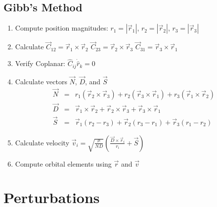 \documentclass{article}
\begin{document}
\begin{multicols*}{3}
    \subsection*{Gibb's Method}
    \begin{enumerate}
        \item Compute position magnitudes: $r_1 = |\vec{r}_1|$,  $r_2 = |\vec{r}_2|$,  $r_3 = |\vec{r}_3|$
        \item Calculate $\vec{C}_{12} = \vec{r}_1 \times \vec{r}_2$ $\vec{C}_{23} = \vec{r}_2 \times \vec{r}_3$ $\vec{C}_{31} = \vec{r}_3 \times \vec{r}_1$
        \item Verify Coplanar: $\hat{C}_{ij} \dot \hat{r}_k = 0$
        \item Calculate vectors $\vec{N}$, $\vec{D}$, and $\vec{S}$
        \begin{equation*}
            \begin{array}{lll}
                \vec{N} & = & r_1(\vec{r}_2\times\vec{r}_3)+r_2(\vec{r}_3\times\vec{r}_1)+r_3(\vec{r}_1\times\vec{r}_2)\\
                \vec{D} & = & \vec{r}_1\times\vec{r}_2+\vec{r}_2\times\vec{r}_3+\vec{r}_3\times\vec{r}_1\\
                \vec{S} & = & \vec{r}_1(r_2-r_3)+\vec{r}_2(r_3-r_1)+\vec{r}_3(r_1-r_2)
            \end{array}
        \end{equation*}
        \item Calculate velocity $\vec{v}_i=\sqrt{\frac{\mu}{ND}}\left(\frac{\vec{D}\times\vec{r}_i}{r_i}+\vec{S}\right)$
        \item Compute orbital elements using $\vec{r}$ and $\vec{v}$
    \end{enumerate}

    \section*{Perturbations}

\end{multicols*}
\end{document}
